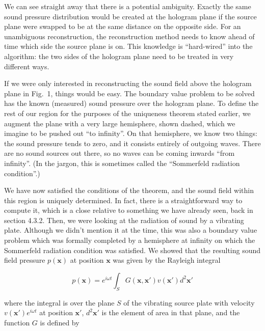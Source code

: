 
  We can see straight away that there is a potential ambiguity. Exactly the 
  same sound pressure distribution would be created at the hologram plane if 
  the source plane were swapped to be at the same distance on the opposite 
  side. For an unambiguous reconstruction, the reconstruction method needs to 
  know ahead of time which side the source plane is on. This knowledge is 
  ``hard-wired'' into the algorithm: the two sides of the hologram plane need 
  to be treated in very different ways. 

  If we were only interested in reconstructing the sound field above the 
  hologram plane in Fig.\ 1, things would be easy. The boundary value problem 
  to be solved has the known (measured) sound pressure over the hologram plane. 
  To define the rest of our region for the purposes of the uniqueness theorem 
  stated earlier, we augment the plane with a very large hemisphere, shown 
  dashed, which we imagine to be pushed out ``to infinity''. On that 
  hemisphere, we know two things: the sound pressure tends to zero, and it 
  consists entirely of outgoing waves. There are no sound sources out there, so 
  no waves can be coming inwards ``from infinity''. (In the jargon, this is 
  sometimes called the ``Sommerfeld radiation condition''.) 

  We have now satisfied the conditions of the theorem, and the sound field 
  within this region is uniquely determined. In fact, there is a 
  straightforward way to compute it, which is a close relative to something we 
  have already seen, back in section 4.3.2. Then, we were looking at the 
  radiation of sound by a vibrating plate. Although we didn't mention it at the 
  time, this was also a boundary value problem which was formally completed by 
  a hemisphere at infinity on which the Sommerfeld radiation condition was 
  satisfied. We showed that the resulting sound field pressure $p(\mathbf{x})$ 
  at position $\mathbf{x}$ was given by the Rayleigh integral 

  $$p(\mathbf{x}) = e^{i \omega t} \int_S{G(\mathbf{x},\mathbf{x'}) 
  v(\mathbf{x'}) d^2 \mathbf{x'}} \tag{1}$$ 

  where the integral is over the plane $S$ of the vibrating source plate with 
  velocity $v(\mathbf{x'})e^{i \omega t}$ at position $\mathbf{x'}$, $d^2 
  \mathbf{x'}$ is the element of area in that plane, and the function $G$ is 
  defined by 

